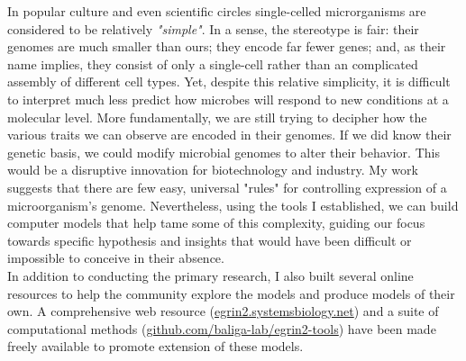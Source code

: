 \documentclass{article}
\begin{document}
In popular culture and even scientific circles single-celled microrganisms are considered to be relatively \textit{"simple"}. In a sense, the stereotype is fair: their genomes are much smaller than ours; they encode far fewer genes; and, as their name implies, they consist of only a single-cell rather than an complicated assembly of different cell types.  Yet, despite this relative simplicity, it is difficult to interpret much less predict how microbes will respond to new conditions at a molecular level. More fundamentally, we are still trying to decipher how the various traits we can observe are encoded in their genomes. If we did know their genetic basis, we could modify microbial genomes to alter their behavior. This would be a disruptive innovation for biotechnology and industry. My work suggests that there are few easy, universal "rules" for controlling expression of a microorganism's genome. Nevertheless, using the tools I established, we can build computer models that help tame some of this complexity, guiding our focus towards specific hypothesis and insights that would have been difficult or impossible to conceive in their absence.\\ 

\noindent In addition to conducting the primary research, I also built several online resources to help the community explore the models and produce models of their own. A comprehensive web resource (\href{http://egrin2.systemsbiology.net}{egrin2.systemsbiology.net}) and a suite of computational methods (\href{http://nbviewer.ipython.org/github/baliga-lab/egrin2-tools/blob/master/doc/index.ipynb}{github.com/baliga-lab/egrin2-tools}) have been made freely available to promote extension of these models.\\[1mm]


\end{document}
